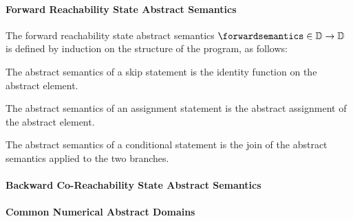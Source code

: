 \paragraph{Forward Reachability State Abstract Semantics}

The forward reachability state abstract semantics $\forwardsemantics\in\forwardtype$ is defined by induction on the structure of the program, as follows:

\begin{description}
  \item[\normalfont ($\pskipstmt$)] The abstract semantics of a skip statement is the identity function on the abstract element.
  \item[\normalfont ($\plassignstmt$)] The abstract semantics of an assignment statement is the abstract assignment of the abstract element.
  \item[\normalfont ($\pifstmt$)] The abstract semantics of a conditional statement is the join of the abstract semantics applied to the two branches.
\end{description}


\paragraph{Backward Co-Reachability State Abstract Semantics}
\paragraph{Common Numerical Abstract Domains}
